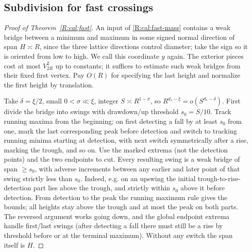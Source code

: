 \subsection{Subdivision for fast crossings}\label{R:cal:subdivision}

\begin{proof}[Proof of Theorem~\ref{R:cal:fast}]
An input of \eqref{R:cal:fast-mass} contains a weak bridge between a minimum and maximum in some signed normal direction of span \(H\asymp R\), since the three lattice directions control diameter; take the sign so it is oriented from low to high. We call this coordinate \(y\) again. The exterior pieces cost at most \(V_{2R}^2\) up to constants; it suffices to estimate such weak bridges from their fixed first vertex. Pay \(O(R)\) for specifying the last height and normalize the first height by translation.

Take \(\delta=\xi/2\), small \(0<\sigma\ll\xi\), integer \(S\asymp R^{1-\sigma}\), so \(R^{d_*-\xi}=o(S^{d_*-\delta})\). First divide the bridge into swings with drawdown/up threshold \(s_0=S/10\). Track running maxima from the beginning; on first detecting a fall by at least \(s_0\) from one, mark the last corresponding peak before detection and switch to tracking running minima starting at detection, with next switch symmetrically after a rise, marking the trough, and so on. Use the marked extrema (not the detection points) and the two endpoints to cut. Every resulting swing is a weak bridge of span \(\ge s_0\), with adverse increments between any earlier and later point of that swing strictly less than \(s_0\). Indeed, e.g. on an upswing the initial trough-to-rise-detection part lies above the trough, and strictly within \(s_0\) above it before detection. From detection to the peak the running maximum rule gives the bounds; all heights stay above the trough and at most the peak on both parts. The reversed argument works going down, and the global endpoint extrema handle first/last swings (after detecting a fall there must still be a rise by threshold before or at the terminal maximum). Without any switch the span itself is \(H\).


\end{proof}
